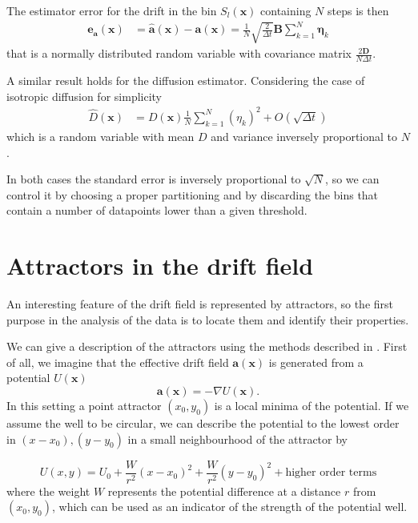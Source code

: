 \documentclass[a4paper]{article}
\begin{document}
The estimator error for the drift in the bin $S_l(\bm{x})$ containing $N$ steps is then
\begin{align}
\bm{e_a}(\bm{x}) &= \hat{\bm{a}}(\bm{x}) - \bm{a}(\bm{x}) = \frac{1}{N} \sqrt{\frac{2}{\Delta t}} \bm{B} \sum_{k = 1}^N \bm{\eta}_k
\end{align}
that is a normally distributed random variable with covariance matrix $\frac{2 \bm{D}}{N \Delta t}$.

A similar result holds for the diffusion estimator. Considering the case of isotropic diffusion for simplicity
\begin{align}
\hat{D}(\bm{x}) &= D(\bm{x}) \frac{1}{N} \sum_{k = 1}^N \left(\eta_k\right)^2 + O(\sqrt{\Delta t})
\end{align}
which is a random variable with mean $D$ and variance inversely proportional to $N$.

In both cases the standard error is inversely proportional to $\sqrt{N}$, so we can control it by choosing a proper partitioning and by discarding the bins that contain a number of datapoints lower than a given threshold.


\section{Attractors in the drift field}

An interesting feature of the drift field is represented by attractors, so the first purpose in the analysis of the data is to locate them and identify their properties.

We can give a description of the attractors using the methods described in \cite{hoze2012}. First of all, we imagine that the effective drift field $\bm{a}(\bm{x})$ is generated from a potential $U(\bm{x})$
\begin{equation} \label{eq:conservative}
\bm{a}(\bm{x}) = -\nabla U(\bm{x}).
\end{equation}
In this setting a point attractor $(x_0, y_0)$ is a local minima of the potential. If we assume the well to be circular, we can describe the potential to the lowest order in $(x - x_0), (y - y_0)$ in a small neighbourhood of the attractor by

\begin{equation} \label{eq:well}
U(x, y) = U_0 + \frac{W}{r^2}\left(x - x_0\right)^2 + \frac{W}{r^2}\left(y - y_0\right)^2 + \text{higher order terms}
\end{equation}
where the weight $W$ represents the potential difference at a distance $r$ from $(x_0, y_0)$, which can be used as an indicator of the strength of the potential well.
\end{document}
